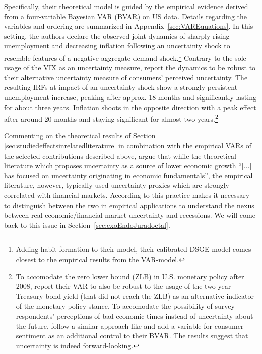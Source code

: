 \documentclass[a4paper,11pt,listof=nochaptergap,oneside,pointednumbers,bibtotoc,bigheadings,liststotoc,hidelinks]{scrbook}
\theoremstyle{mysatz}
\theoremstyle{mydefinition}
\theoremstyle{mytheorem}
\theoremstyle{mybemerkung}
\begin{document}
Specifically, their theoretical model is guided by the empirical evidence derived from a four-variable Bayesian VAR (BVAR) on US data. Details regarding the variables and ordering are summarized in Appendix~\ref{sec:VAREquations}. In this setting, the authors declare the observed joint dynamics of sharply rising unemployment and decreasing inflation following an uncertainty shock to resemble features of a negative aggregate demand shock.\footnote{Adding habit formation to their model, their calibrated DSGE model comes closest to the empirical results from the VAR-model.} Contrary to the sole usage of the VIX as an uncertainty measure, \citet{leducandliu:16} report the dynamics to be robust to their alternative uncertainty measure of consumers' perceived uncertainty. The resulting IRFs at impact of an uncertainty shock show a strongly persistent unemployment increase, peaking after approx. 18 months and significantly lasting for about three years. Inflation shoots in the opposite direction with a peak effect after around 20 months and staying significant for almost two years.\footnote{To accomodate the zero lower bound (ZLB) in U.S. monetary policy after 2008, \citet{leducandliu:16} report their VAR to also be robust to the usage of the two-year Treasury bond yield (that did not reach the ZLB) as an alternative indicator of the monetary policy stance. To accomodate the possibility of survey respondents' perceptions of bad economic times instead of uncertainty about the future, \citet{leducandliu:16} follow a similar approach like \citet{bakeretal:15} and add a variable for consumer sentiment as an additional control to their BVAR. The results suggest that uncertainty is indeed forward-looking.}

Commenting on the theoretical results of Section \ref{sec:studiedeffectsinrelatedliterature} in combination with the empirical VARs of the selected contributions described above, \citet[p. 4]{ludvigsonetal:19} argue that while the theoretical literature which proposes uncertainty as a source of lower economic growth ``[...] has focused on uncertainty originating in economic fundamentals'', the empirical literature, however, typically used uncertainty proxies which are strongly correlated with financial markets. According to \citet{ludvigsonetal:19} this practice makes it necessary to distinguish between the two in empirical applications to understand the nexus between real economic/financial market uncertainty and recessions. We will come back to this issue in Section~\ref{sec:exoEndoJuradoetal}.
\end{document}
